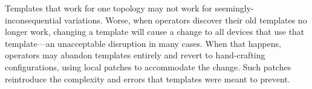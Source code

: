 \documentclass[numbers, 10pt, preprint]{sigplanconf}
\newcommand{\IE}{\emph{i.e.}}
\begin{document}

Templates that work for one topology may not work for seemingly-inconsequential variations.  
Worse, when operators discover their old templates no longer work, changing a template will
cause a change to all devices that use that template---an unacceptable disruption in many cases.  When that happens, operators may abandon templates entirely and revert to hand-crafting configurations, using local patches to accommodate the change.
Such patches reintroduce the complexity and errors that templates were meant to prevent.



\end{document}
